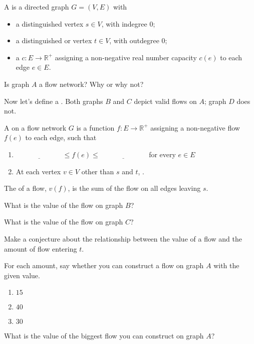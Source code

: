 \documentclass{tufte-handout}
\begin{document}
\newcommand{\R}{\mathbb{R}}

\pause
\begin{defn}
  A  is a directed graph $G = (V,E)$ with
  \begin{itemize}
  \item a distinguished  vertex $s \in V$, with indegree 0;
  \item a distinguished  or  vertex $t \in V$,
    with outdegree 0;
  \item a  $c : E \to \R^+$ assigning a
    non-negative real number capacity $c(e)$ to each edge $e \in E$.
  \end{itemize}
\end{defn}

\begin{questions}
  \item Is graph $A$ a flow network?  Why or why not?
\end{questions}

Now let's define a .  Both graphs $B$ and $C$ depict valid
flows on $A$; graph $D$ does not.

\begin{defn}
  A  on a flow network $G$ is a function $f : E \to \R^+$
  assigning a non-negative flow $f(e)$ to each edge, such that
  \begin{enumerate}
  \item $\underline{\phantom{XXXXXXXX}} \leq f(e) \leq
    \underline{\phantom{XXXXXXXX}}$ for every $e \in E$
  \item At each vertex $v \in V$ other than $s$ and $t$, \blank
    \newline \blank.
  \end{enumerate}
\end{defn}

\begin{defn}
  The  of a flow, $v(f)$, is the sum of the flow on all
  edges leaving $s$.
\end{defn}

\begin{questions}
  \item What is the value of the flow on graph $B$?
  \item What is the value of the flow on graph $C$?
  \item Make a conjecture about the relationship between the value of
    a flow and the amount of flow entering $t$.
  \item For each amount, say whether you can construct a flow on graph
    $A$ with the given value.
    \begin{enumerate}[label=(\alph*)]
    \item $15$ \vspace{1in}
    \item $40$ \vspace{1in}
    \item $30$ \vspace{1in}
    \end{enumerate}
  \item What is the value of the biggest flow you can construct on
    graph $A$?
\end{questions}
\end{document}
